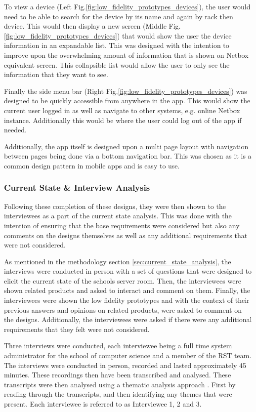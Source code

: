 \documentclass [11pt,a4paper]{article}
\begin{document}
To view a device (Left Fig.\ref{fig:low_fidelity_prototypes_devices}), the user would need to be able to search for the device by its name and again by rack then device. This would then display a new screen (Middle Fig.\ref{fig:low_fidelity_prototypes_devices}) that would show the user the device information in an expandable list. This was designed with the intention to improve upon the overwhelming amount of information that is shown on Netbox equivalent screen. This collapsible list would allow the user to only see the information that they want to see.

Finally the side menu bar (Right Fig.\ref{fig:low_fidelity_prototypes_devices}) was designed to be quickly accessible from anywhere in the app. This would show the current user logged in as well as navigate to other systems, e.g. online Netbox instance. Additionally this would be where the user could log out of the app if needed.

Additionally, the app itself is designed upon a multi page layout with navigation between pages being done via a bottom navigation bar. This was chosen as it is a common design pattern in mobile apps and is easy to use. 


\subsubsection{Current State \& Interview Analysis}
\label{sec:ui_design_interview_analysis}
Following these completion of these designs, they were then shown to the interviewees as a part of the current state analysis. This was done with the intention of ensuring that the base requirements were considered but also any comments on the designs themselves as well as any additional requirements that were not considered. 

As mentioned in the methodology section \ref{sec:current_state_analysis}, the interviews were conducted in person with a set of questions that were designed to elicit the current state of the schools server room. Then, the interviewees were shown related products and asked to interact and comment on them. Finally, the interviewees were shown the low fidelity prototypes and with the context of their previous answers and opinions on related products, were asked to comment on the designs. Additionally, the interviewees were asked if there were any additional requirements that they felt were not considered.

Three interviews were conducted, each interviewee being a full time system administrator for the school of computer science and a member of the RST team. The interviews were conducted in person, recorded and lasted approximately 45 minutes. These recordings then have been transcribed and analysed. These transcripts were then analysed using a thematic analysis approach \cite{thematicAnal}. First by reading through the transcripts, and then identifying any themes that were present. Each interviewee is referred to as Interviewee 1, 2 and 3. 
\end{document}
